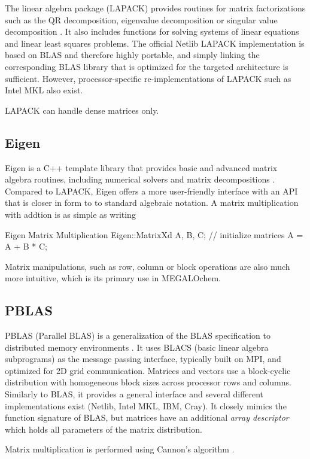 The linear algebra package (LAPACK) provides routines for matrix factorizations such as the QR decomposition, eigenvalue decomposition or singular value decomposition \cite{LAP2021}. It also includes functions for solving systems of linear equations and linear least squares problems. The official Netlib LAPACK implementation is based on BLAS and therefore highly portable, and simply linking the corresponding BLAS library that is optimized for the targeted architecture is sufficient. However, processor-specific re-implementations of LAPACK such as Intel MKL also exist.

LAPACK can handle dense matrices only. 

\subsection{Eigen}

Eigen is a C++ template library that provides basic and advanced matrix algebra routines, including numerical solvers and matrix decompositions \cite{Gue2010}. Compared to LAPACK, Eigen offers a more user-friendly interface with an API that is closer in form to to standard algebraic notation. A matrix multiplication with addtion is as simple as writing
\begin{cpp}{Eigen Matrix Multiplication}
Eigen::MatrixXd A, B, C;
// initialize matrices
A = A + B * C;
\end{cpp}
\noindent Matrix manipulations, such as row, column or block operations are also much more intuitive, which is its primary use in MEGALOchem.

\subsection{PBLAS}

PBLAS (Parallel BLAS) is a generalization of the BLAS specification to distributed memory environments \cite{PBLAS2021}. It uses BLACS (basic linear algebra subprograms) as the message passing interface, typically built on MPI, and optimized for 2D grid communication. Matrices and vectors use a block-cyclic distribution with homogeneous block sizes across processor rows and columns. Similarly to BLAS, it provides a general interface and several different implementations exist (Netlib, Intel MKL, IBM, Cray). It closely mimics the function signature of BLAS, but matrices have an additional \emph{array descriptor} which holds all parameters of the matrix distribution.

Matrix multiplication is performed using Cannon's algorithm \cite{Can1969}.

